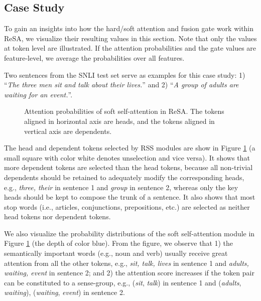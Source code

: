 \documentclass{article}
\begin{document}
\subsection{Case Study}
To gain an insights into how the hard/soft attention and fusion gate work within ReSA, we visualize their resulting values in this section. Note that only the values at token level are illustrated. If the attention probabilities and the gate values are feature-level, we average the probabilities over all features. 

Two sentences from the SNLI test set serve as examples for this case study: 1) ``\textit{The three men sit and talk about their lives.}'' and 2) ``\textit{A group of adults are waiting for an event.}''.

\begin{figure}[t] \centering
	\caption{Attention probabilities of soft self-attention in ReSA. The tokens aligned in horizontal axis are heads, and the tokens aligned in vertical axis are dependents.}
	\label{fig:case_soft_attn}
\end{figure}

The head and dependent tokens selected by RSS modules are show in Figure \ref{fig:case_soft_attn} (a small square with color white denotes unselection and vice versa). It shows that more dependent tokens are selected than the head tokens, because all non-trivial dependents should be retained to adequately modify the corresponding heads, e.g., \textit{three, their} in sentence 1 and \textit{group} in sentence 2, whereas only the key heads should be kept to compose the trunk of a sentence. It also shows that most stop words (i.e., articles, conjunctions, prepositions, etc.) are selected as neither head tokens nor dependent tokens.

We also visualize the probability distributions of the soft self-attention module in Figure \ref{fig:case_soft_attn} (the depth of color blue). From the figure, we observe that 1) the semantically important words (e.g., noun and verb) usually receive great attention from all the other tokens, e.g., \textit{sit, talk, lives} in sentence 1 and \textit{adults, waiting, event} in sentence 2; and 2) the attention score increases if the token pair can be constituted to a sense-group, e.g., (\textit{sit}, \textit{talk}) in sentence 1 and (\textit{adults}, \textit{waiting}), (\textit{waiting}, \textit{event}) in sentence 2.
\end{document}

